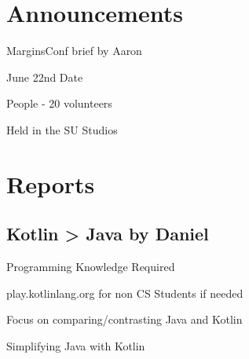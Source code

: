 \documentclass[11pt,hacksoc]{meetingmins}
\begin{document}
\maketitle

\section{Announcements}
\begin{items}
	\item
	MarginsConf brief by Aaron
	
		\subitem
		June 22nd Date
		
		 People - 20 volunteers
		
		\subitem
		Held in the SU Studios
		
		\subitem

\end{items}

\section{Reports}

\subsection{Kotlin > Java by Daniel}
\begin{hiddensubitems}
	\item
	Programming Knowledge Required
	
	\item
	
	\item
	play.kotlinlang.org for non CS Students if needed
	
	\item
	Focus on comparing/contrasting Java and Kotlin
	
	\item
	Simplifying Java with Kotlin
	
\end{hiddensubitems}
\end{document}
